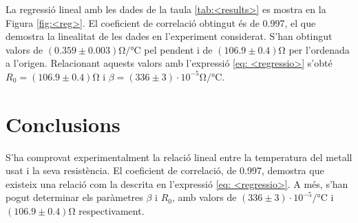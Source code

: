 La regressió lineal amb les dades de la taula \ref{tab:<results>} es mostra en la Figura \ref{fig:<reg>}. El coeficient de correlació obtingut és de 0.997, el que demostra la linealitat de les dades en l'experiment considerat. S'han obtingut valors de $(0.359\pm0.003)\si{\ohm\per\celsius}$ pel pendent i de $(106.9\pm0.4)\si{\ohm}$ per l'ordenada a l'origen. Relacionant aquests valors amb l'expressió \ref{eq: <regressio>} s'obté $R_0=(106.9\pm0.4)\si{\ohm}$ i $\beta=(336\pm3)\cdot10^{-5}\si{\ohm\per\celsius}$.
\section{Conclusions}
S'ha comprovat experimentalment la relació lineal entre la temperatura del metall usat i la seva resistència. El coeficient de correlació, de 0.997, demostra que existeix una relació com la descrita en l'expressió \ref{eq: <regressio>}. A més, s'han pogut determinar els paràmetres $\beta$ i $R_0$, amb valors de $(336\pm3)\cdot10^{-5}\si{\per\celsius}$ i $(106.9\pm0.4)\si{\ohm}$ respectivament.









